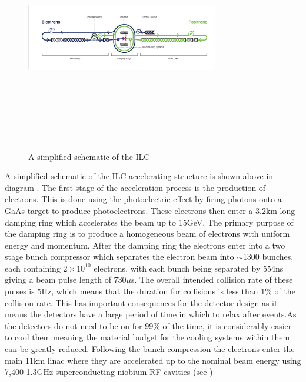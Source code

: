 \begin{figure}
  \centering
  \includegraphics[width=0.75\textwidth,height=10cm,keepaspectratio]{fig/ILC_Simplified}
  \caption[Schematic Of The ILC]{A simplified schematic of the ILC}
  \label{Fig:ILCsimple}
\end{figure}

A simplified schematic of the \ac{ILC} accelerating structure is shown above in diagram . The first stage of the acceleration process is the production of electrons. This is done using the photoelectric effect by firing photons onto a GaAs target to produce photoelectrons. These electrons then enter a 3.2km long damping ring which accelerates the beam up to 15GeV. The primary purpose of the damping ring is to produce a homogeneous beam of electrons with uniform energy and momentum. After the damping ring the electrons enter into a two stage bunch compressor which separates the electron beam into ${\sim}$1300 bunches, each containing ${2\times10^{10}}$ electrons, with each bunch being separated by 554ns giving a beam pulse length of 730${\mu}$s. The overall intended collision rate of these pulses is 5Hz, which means that the duration for collisions is less than 1\% of the collision rate. This has important consequences for the detector design as it means the detectors have a large period of time in which to relax after events.As the detectors do not need to be on for 99\% of the time, it is considerably easier to cool them meaning the material budget for the cooling systems within them can be greatly reduced. Following the bunch compression the electrons enter the main 11km linac where they are accelerated up to the nominal beam energy using 7,400 1.3GHz superconducting niobium \ac{RF} cavities (see ) 

